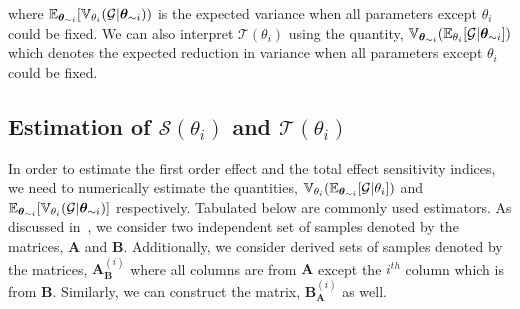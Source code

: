 \noindent where $\operatorname{\mathbb{E}}_{\bm \theta_{\sim i}}[\operatorname{\mathbb{V}}_{\theta_{i}}(\mathcal{G}\vert\bm{\theta}_{\sim i}))$ is the expected variance when all parameters
except $\theta_{i}$ could be fixed. We can also interpret $\mathcal{T}(\theta_{i})$ using the quantity,
$\operatorname{\mathbb{V}}_{\bm \theta_{\sim i}}(\operatorname{\mathbb{E}}_{\theta_{i}}[\mathcal{G}\vert\bm\theta_{\sim i}])$ which denotes the expected reduction in variance
when all parameters except $\theta_{i}$ could be fixed.

\subsection{Estimation of $\mathcal{S}(\theta_{i})$ and $\mathcal{T}(\theta_{i})$}

In order to estimate the first order effect and the total effect sensitivity indices, we need to numerically estimate
the quantities, $\operatorname{\mathbb{V}}_{\theta_{i}}(\operatorname{\mathbb{E}}_{\bm \theta_{\sim i}}[\mathcal{G}\vert\theta_{i}])$ and 
$\operatorname{\mathbb{E}}_{\bm \theta_{\sim i}}[\operatorname{\mathbb{V}}_{\theta_{i}}(\mathcal{G}\vert\bm{\theta}_{\sim i})]$ respectively. Tabulated below are commonly used estimators. As discussed in~\cite{Saltelli:2010}, we consider two independent set of samples denoted by the matrices,
$\bm A$ and $\bm B$. Additionally, we consider derived sets of samples denoted by the  matrices,
$\bm A_{\bm B}^{(i)}$ where all columns
are from $\bm A$ except the $i^{th}$ column which is from $\bm B$. Similarly, we can construct the matrix, 
$\bm B_{\bm A}^{(i)}$ as well. 



